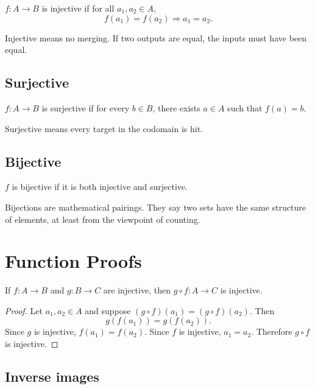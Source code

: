 \documentclass[11pt]{article}
\begin{document}
\begin{definition}
$f:A\to B$ is injective if for all $a_1,a_2\in A$,
\[
f(a_1)=f(a_2)\Rightarrow a_1=a_2.
\]
\end{definition}

Injective means no merging. If two outputs are equal, the inputs must have been equal.

\subsection{Surjective}

\begin{definition}
$f:A\to B$ is surjective if for every $b\in B$, there exists $a\in A$ such that $f(a)=b$.
\end{definition}

Surjective means every target in the codomain is hit.

\subsection{Bijective}

\begin{definition}
$f$ is bijective if it is both injective and surjective.
\end{definition}

Bijections are mathematical pairings. They say two sets have the same structure of elements, at least from the viewpoint of counting.

\newpage
\section{Function Proofs}

\begin{theorem}
If $f:A\to B$ and $g:B\to C$ are injective, then $g\circ f:A\to C$ is injective.
\end{theorem}

\begin{proof}
Let $a_1,a_2\in A$ and suppose $(g\circ f)(a_1)=(g\circ f)(a_2)$. Then
\[
g(f(a_1))=g(f(a_2)).
\]
Since $g$ is injective, $f(a_1)=f(a_2)$. Since $f$ is injective, $a_1=a_2$. Therefore $g\circ f$ is injective.
\end{proof}

\subsection{Inverse images}
\end{document}
